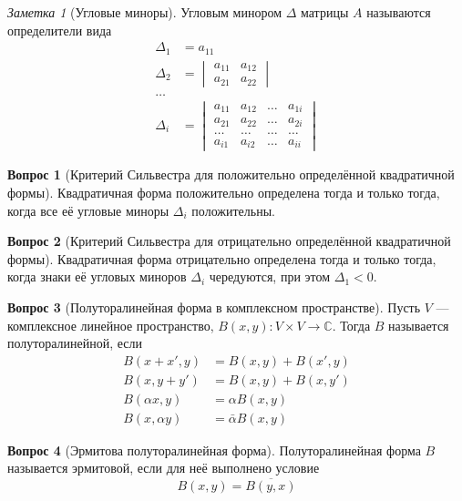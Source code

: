 \documentclass[a4paper,11pt]{article}
\theoremstyle{remark}
\newtheorem*{note}{Заметка}
\theoremstyle{definition}
\newtheorem{question}{Вопрос}
\begin{document}
\begin{note}[Угловые миноры]
Угловым минором \(\Delta\) матрицы \(A\) называются определители вида
\begin{align*}
	\Delta_1 &= a_{11} \\
	\Delta_2 &=
		\begin{vmatrix}
			a_{11} & a_{12} \\
			a_{21} & a_{22}
		\end{vmatrix} \\
	\dots \\
	\Delta_i &=
		\begin{vmatrix}
			a_{11} & a_{12} & \dots & a_{1i} \\
			a_{21} & a_{22} & \dots & a_{2i} \\
			\dots & \dots & \dots & \dots \\
			a_{i1} & a_{i2} & \dots & a_{ii}
		\end{vmatrix} 
\end{align*}
\end{note}

\begin{question}[Критерий Сильвестра для положительно определённой квадратичной формы]
Квадратичная форма положительно определена тогда и только тогда, когда все её угловые миноры \(\Delta_i\) положительны.
\end{question}

\begin{question}[Критерий Сильвестра для отрицательно определённой квадратичной формы]
Квадратичная форма отрицательно определена тогда и только тогда, когда знаки её угловых миноров \(\Delta_i\) чередуются, при этом \(\Delta_1 < 0\).
\end{question}


\begin{question}[Полуторалинейная форма в комплексном пространстве]
Пусть \(V\) --- комплексное линейное пространство, \(B(x,y): V \times V \rightarrow \mathbb{C}\). Тогда \(B\) называется полуторалинейной, если
\begin{align*}
	B(x + x', y) &= B(x, y) + B(x', y) \\
	B(x, y + y') &= B(x, y) + B(x, y') \\
	B(\alpha{}x, y) &= \alpha{}B(x, y) \\
	B(x, \alpha{}y) &= \bar{\alpha}B(x, y)
\end{align*}
\end{question}


\begin{question}[Эрмитова полуторалинейная форма]
Полуторалинейная форма \(B\) называется эрмитовой, если для неё выполнено условие
\begin{equation*}
	B(x, y) = \overline{B(y, x)}
\end{equation*}
\end{question}
\end{document}
